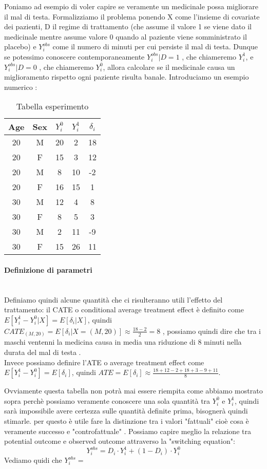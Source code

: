 \documentclass{article}
\begin{document}
Poniamo ad esempio di voler capire se veramente un medicinale possa migliorare il mal di testa. Formalizziamo il problema ponendo X come l'insieme di covariate dei pazienti, D il regime di trattamento (che assume il valore 1 se viene dato il medicinale mentre assume valore 0 quando al paziente viene somministrato il placebo) e $Y^{obs}_i$ come il numero di minuti per cui persiste il mal di testa. 
Dunque se potessimo conoscere contemporaneamente  $Y^{obs}_i|D=1$ , che chiameremo $Y^{1}_i$, e $Y^{obs}_i|D=0$ , che chiameremo $Y^{0}_i$, allora calcolare se il medicinale causa un miglioramento rispetto ogni paziente risulta banale. Introduciamo un esempio numerico : 
\begin{table}[H]
\centering
\begin{tabular}{|c|c|c|c|c|}
\hline
Age & Sex & $Y^{0}_i$ & $Y^{1}_i$ & $\delta_i$ \\ \hline
20 & M & 20 & 2 & 18  \\ \hline
20 & F & 15 & 3 & 12 \\ \hline
20 & M & 8 & 10 & -2 \\ \hline
20 & F & 16 & 15 & 1 \\ \hline
30 & M & 12 & 4 & 8 \\ \hline
30 & F & 8 & 5 & 3 \\ \hline
30 & M & 2 & 11 & -9  \\ \hline
30 & F & 15 & 26 & 11 \\ \hline
\end{tabular}
\caption{Tabella esperimento }
\end{table}

\paragraph{Definizione di parametri} \\
Definiamo quindi alcune quantità che ci risulteranno utili l'effetto del trattamento: il CATE o conditional average treatment effect è definito come $E[Y^{1}_i- Y^{0}_i|X] = E[\delta_i|X]$, quindi $CATE_{(M,20)}=E[\delta_i|X=(M,20)] \approx \frac{18-2}{2}=8$ , possiamo quindi dire che tra i maschi ventenni la medicina causa in media una riduzione di 8 minuti nella durata del mal di testa .\\ 
Invece possiamo definire l'ATE o average treatment effect come  $E[Y^{1}_i- Y^{0}_i] = E[\delta_i]$, quindi $ATE= E[\delta_i] \approx \frac{18+12-2+18+3-9+11}{8}$. 

Ovviamente questa tabella non potrà mai essere riempita come abbiamo mostrato sopra perchè possiamo veramente conoscere una sola quantità tra $Y^0_{i}$ e $Y^1_{i}$, quindi sarà impossibile avere certezza sulle quantità definite prima, bisognerà quindi stimarle. per questo è utile fare la distinzione tra i valori "fattuali" cioè cosa è veramente successo e "controfattuale" .
Possiamo capire meglio la relazione tra potential outcome e observed outcome attraverso la  "switching equation": 
\begin{equation}
Y_i^{obs} = D_i \cdot Y^1_i + (1-D_i) \cdot Y^0_i
\label{eq:switching}
\end{equation}
Vediamo quidi che $Y_i^{obs} = $
\end{document}
